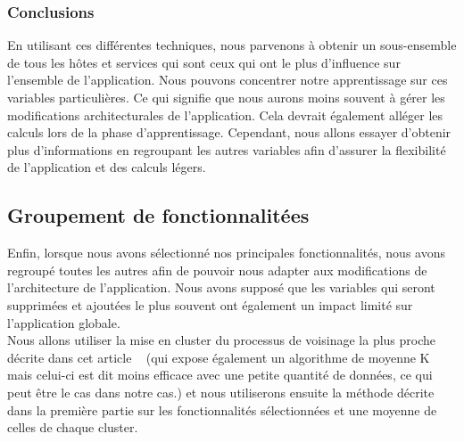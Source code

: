 \documentclass[10pt,a4paper,oneside]{article}
\begin{document}
\begin{multicols}{2}
\subsubsection{Conclusions}
En utilisant ces différentes techniques, nous parvenons à obtenir un sous-ensemble de tous les hôtes et services qui sont ceux qui ont le plus d’influence sur l’ensemble de l’application. Nous pouvons concentrer notre apprentissage sur ces variables particulières. Ce qui signifie que nous aurons moins souvent à gérer les modifications architecturales de l'application. Cela devrait également alléger les calculs lors de la phase d'apprentissage. Cependant, nous allons essayer d'obtenir plus d'informations en regroupant les autres variables afin d'assurer la flexibilité de l'application et des calculs légers.\\
\subsection{Groupement de fonctionnalitées}
Enfin, lorsque nous avons sélectionné nos principales fonctionnalités, nous avons regroupé toutes les autres afin de pouvoir nous adapter aux modifications de l’architecture de l’application. Nous avons supposé que les variables qui seront supprimées et ajoutées le plus souvent ont également un impact limité sur l'application globale.\\
Nous allons utiliser la mise en cluster du processus de voisinage la plus proche décrite dans cet article ~\cite{ref5} (qui expose également un algorithme de moyenne K mais celui-ci est dit moins efficace avec une petite quantité de données, ce qui peut être le cas dans notre cas.) et nous utiliserons ensuite la méthode décrite dans la première partie sur les fonctionnalités sélectionnées et une moyenne de celles de chaque cluster.
\end{multicols}

\vspace{0.8cm}

{}

\end{document}
